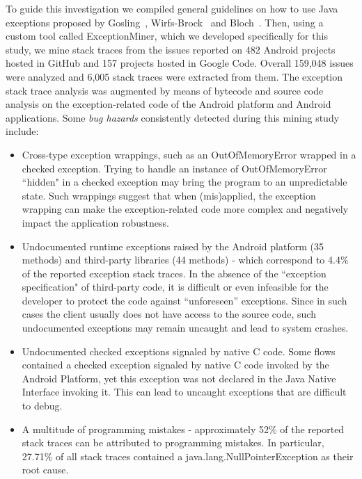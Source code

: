 To guide this investigation we compiled general guidelines on how to use Java
exceptions proposed by Gosling~\cite{gosling2000java},
Wirfs-Brock~\cite{wirfs2006toward} and Bloch~\cite{bloch2008effective}.
Then, using a custom tool called ExceptionMiner,
 which we developed specifically for this study, we mine stack traces from the issues reported 
on 482 Android projects hosted in GitHub and 157 projects hosted in Google Code.
Overall 159,048 issues were analyzed and 6,005 stack traces were extracted from them.
The exception stack trace analysis was augmented by means of bytecode 
and source code analysis on the exception-related code of the Android 
platform and Android applications. Some \emph{bug hazards} consistently detected 
during this mining study include:

\begin{itemize}

   \item  Cross-type exception wrappings, such as an OutOfMemoryError wrapped in a checked exception.
Trying to handle an instance of OutOfMemoryError ``hidden" in  a checked exception may bring the program
 to an unpredictable state. Such wrappings suggest that when (mis)applied, the exception wrapping can make 
the exception-related code more complex and negatively impact the application robustness.

  \item  Undocumented runtime exceptions raised by the Android platform (35 methods) and  third-party libraries (44 methods) -
 which correspond to 4.4\% of the reported exception stack traces.
In the absence of the ``exception specification" of third-party code, it is difficult or 
even infeasible for the developer to protect the code against ``unforeseen'' exceptions. 
Since in such cases the client usually does not have access to the source code, such undocumented 
exceptions may remain uncaught and lead to system crashes. 

   \item Undocumented checked exceptions signaled by native C code.  Some flows contained a checked 
exception signaled by native C code invoked by the Android Platform, yet this exception was not declared
 in the Java Native Interface invoking it. This can lead to uncaught exceptions that are 
difficult to debug. 

 \item A multitude of programming mistakes - approximately 52\% of the reported stack traces can 
be attributed to programming mistakes. In particular, 27.71\% of all stack traces contained a java.lang.NullPointerException 
as their root cause.

\end{itemize}

